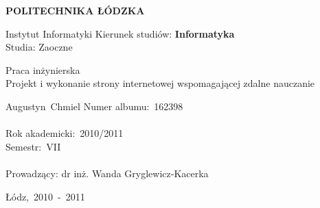 \documentclass[a4paper,12pt]{report}
\begin{document}
\cfoot{\thepage}
\begin{center}
\textbf{POLITECHNIKA ŁÓDZKA}
\end{center}
\begin{flushleft}
Instytut Informatyki \newline
Kierunek studiów: \textbf{Informatyka} \\
Studia: Zaoczne \\
\end{flushleft}
\vspace{4cm}
\begin{center}
Praca inżynierska \\
Projekt i wykonanie strony internetowej wspomagającej zdalne nauczanie \\
\end{center}
\smallskip
\begin{flushleft}
Augustyn~Chmiel \newline
Numer albumu:~162398 \\
\ \\
Rok akademicki:~2010/2011 \\
Semestr:~VII \\
\ \\
Prowadzący:\hspace{1.5cm} dr inż. Wanda Gryglewicz-Kacerka \\
\end{flushleft}
\vspace{8cm}
\begin{center}
Łódz,~2010~-~2011
\end{center}
\newpage

\tableofcontents
\newpage
\end{document}
